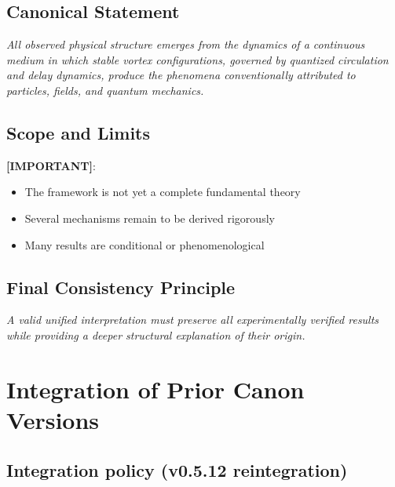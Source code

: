 \documentclass[11pt]{article}
\theoremstyle{definition}
\theoremstyle{plain}
\theoremstyle{remark}
\begin{document}
    \subsection{Canonical Statement}
        
        \begin{center}
            \textit{
                All observed physical structure emerges from the dynamics of a continuous medium in which stable vortex configurations, governed by quantized circulation and delay dynamics, produce the phenomena conventionally attributed to particles, fields, and quantum mechanics.
            }
        \end{center}
    
    \subsection{Scope and Limits}
        
        \textbf{[IMPORTANT]}:
        
        \begin{itemize}
            \item The framework is not yet a complete fundamental theory
            \item Several mechanisms remain to be derived rigorously
            \item Many results are conditional or phenomenological
        \end{itemize}
    
    \subsection{Final Consistency Principle}
        
        \begin{center}
            \textit{
                A valid unified interpretation must preserve all experimentally verified results while providing a deeper structural explanation of their origin.
            }
        \end{center}

    \section{Integration of Prior Canon Versions}
        \label{sec:integration}

    \subsection{Integration policy (v0.5.12 reintegration)}
\end{document}
